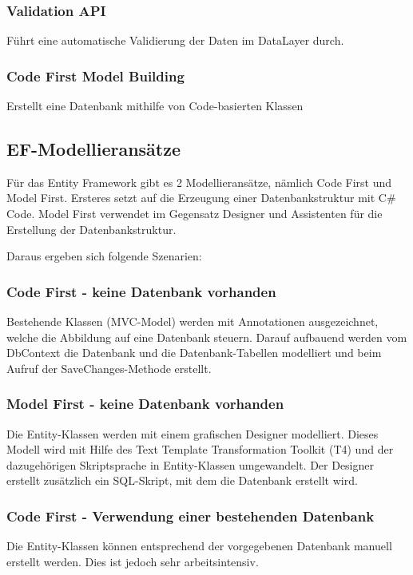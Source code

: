 \subsubsection{Validation API}
Führt eine automatische Validierung der Daten im DataLayer durch.

\subsubsection{Code First Model Building}
Erstellt eine Datenbank mithilfe von Code-basierten Klassen

\subsection{EF-Modellieransätze}
Für das Entity Framework gibt es 2 Modellieransätze, nämlich Code First und Model First. Ersteres setzt auf die Erzeugung einer 
Datenbankstruktur mit C\# Code. Model First verwendet im Gegensatz Designer und Assistenten für die Erstellung der Datenbankstruktur.

Daraus ergeben sich folgende Szenarien:

\subsubsection{Code First - keine Datenbank vorhanden}
Bestehende Klassen (MVC-Model) werden mit Annotationen ausgezeichnet, welche die Abbildung auf eine Datenbank steuern.
Darauf aufbauend werden vom DbContext die Datenbank und die Datenbank-Tabellen modelliert und beim Aufruf der SaveChanges-Methode erstellt.

\subsubsection{Model First - keine Datenbank vorhanden}
Die Entity-Klassen werden mit einem grafischen Designer modelliert. Dieses Modell wird mit Hilfe des Text Template Transformation Toolkit (T4) und 
der dazugehörigen Skriptsprache in Entity-Klassen umgewandelt. Der Designer erstellt zusätzlich ein SQL-Skript, mit dem die Datenbank erstellt wird.

\subsubsection{Code First - Verwendung einer bestehenden Datenbank}
Die Entity-Klassen können entsprechend der vorgegebenen Datenbank manuell erstellt werden. Dies ist jedoch sehr arbeitsintensiv.

